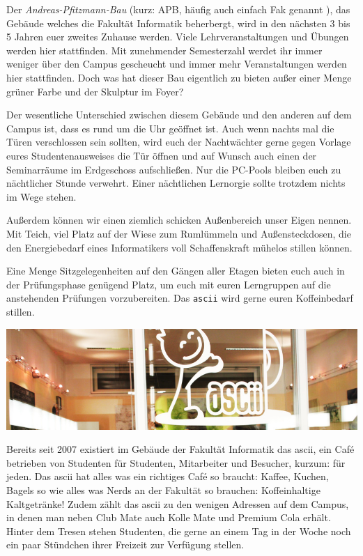 
Der \emph{Andreas-Pfitzmann-Bau} (kurz: APB, häufig auch einfach \glqq{}Fak\grqq{} genannt ), das Gebäude welches die Fakultät Informatik beherbergt, wird in den nächsten 3 bis 5 Jahren euer zweites Zuhause werden.
Viele Lehrveranstaltungen und Übungen werden hier stattfinden. Mit zunehmender Semesterzahl werdet ihr immer weniger über den Campus gescheucht und immer mehr Veranstaltungen werden hier stattfinden. 
Doch was hat dieser Bau eigentlich zu bieten außer einer Menge grüner Farbe und der Skulptur im Foyer?

Der wesentliche Unterschied zwischen diesem Gebäude und den anderen auf dem Campus ist, dass es rund um die Uhr geöffnet ist. Auch wenn nachts mal die Türen verschlossen sein sollten, wird euch der Nachtwächter gerne gegen Vorlage eures Studentenausweises die Tür öffnen und auf Wunsch auch einen der Seminarräume im Erdgeschoss aufschließen. Nur die PC-Pools bleiben euch zu nächtlicher Stunde verwehrt.
Einer nächtlichen Lernorgie sollte trotzdem nichts im Wege stehen.

Außerdem können wir einen ziemlich schicken Außenbereich unser Eigen nennen. Mit Teich, viel Platz auf der Wiese zum Rumlümmeln und Außensteckdosen, die den Energiebedarf eines Informatikers voll Schaffenskraft mühelos stillen können.

Eine Menge Sitzgelegenheiten auf den Gängen aller Etagen bieten euch auch in der Prüfungsphase genügend Platz, um euch mit euren Lerngruppen auf die anstehenden Prüfungen vorzubereiten. Das \texttt{ascii} wird gerne euren Koffeinbedarf stillen.



\pagebreak


\includegraphics[width=\linewidth]{img/ascii.jpg}

Bereits seit 2007 existiert im Gebäude der Fakultät Informatik das ascii, ein Café betrieben von Studenten für Studenten, Mitarbeiter und Besucher, kurzum: für jeden.
Das ascii hat alles was ein richtiges Café so braucht: Kaffee, Kuchen, Bagels so wie alles was Nerds an der Fakultät so brauchen: Koffeinhaltige Kaltgetränke!
Zudem zählt das ascii zu den wenigen Adressen auf dem Campus, in denen man neben Club Mate auch Kolle Mate und Premium Cola erhält.
Hinter dem Tresen stehen Studenten, die gerne an einem Tag in der Woche noch ein paar Stündchen ihrer Freizeit zur Verfügung stellen.

